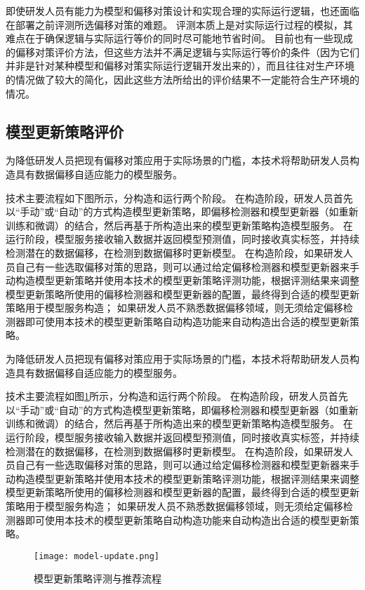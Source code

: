 即使研发人员有能力为模型和偏移对策设计和实现合理的实际运行逻辑，也还面临在部署之前评测所选偏移对策的难题。
评测本质上是对实际运行过程的模拟，其难点在于确保逻辑与实际运行等价的同时尽可能地节省时间。
目前也有一些现成的偏移对策评价方法，但这些方法并不满足逻辑与实际运行等价的条件（因为它们并非是针对某种模型和偏移对策实际运行逻辑开发出来的），而且往往对生产环境的情况做了较大的简化，因此这些方法所给出的评价结果不一定能符合生产环境的情况。

\subsection{模型更新策略评价}

为降低研发人员把现有偏移对策应用于实际场景的门槛，本技术将帮助研发人员构造具有数据偏移自适应能力的模型服务。

技术主要流程如下图所示，分构造和运行两个阶段。
在构造阶段，研发人员首先以“手动”或“自动”的方式构造模型更新策略，即偏移检测器和模型更新器（如重新训练和微调）的结合，然后再基于所构造出来的模型更新策略构造模型服务。
在运行阶段，模型服务接收输入数据并返回模型预测值，同时接收真实标签，并持续检测潜在的数据偏移，在检测到数据偏移时更新模型。
在构造阶段，如果研发人员自己有一些选取偏移对策的思路，则可以通过给定偏移检测器和模型更新器来手动构造模型更新策略并使用本技术的模型更新策略评测功能，根据评测结果来调整模型更新策略所使用的偏移检测器和模型更新器的配置，最终得到合适的模型更新策略用于模型服务构造；
如果研发人员不熟悉数据偏移领域，则无须给定偏移检测器即可使用本技术的模型更新策略自动构造功能来自动构造出合适的模型更新策略。

为降低研发人员把现有偏移对策应用于实际场景的门槛，本技术将帮助研发人员构造具有数据偏移自适应能力的模型服务。

技术主要流程如图\ref{fig:modelupdate}所示，分构造和运行两个阶段。
在构造阶段，研发人员首先以“手动”或“自动”的方式构造模型更新策略，即偏移检测器和模型更新器（如重新训练和微调）的结合，然后再基于所构造出来的模型更新策略构造模型服务。
在运行阶段，模型服务接收输入数据并返回模型预测值，同时接收真实标签，并持续检测潜在的数据偏移，在检测到数据偏移时更新模型。
在构造阶段，如果研发人员自己有一些选取偏移对策的思路，则可以通过给定偏移检测器和模型更新器来手动构造模型更新策略并使用本技术的模型更新策略评测功能，根据评测结果来调整模型更新策略所使用的偏移检测器和模型更新器的配置，最终得到合适的模型更新策略用于模型服务构造；
如果研发人员不熟悉数据偏移领域，则无须给定偏移检测器即可使用本技术的模型更新策略自动构造功能来自动构造出合适的模型更新策略。

\begin{figure}
  \centering
  \texttt{[image: model-update.png]}
  \caption{模型更新策略评测与推荐流程}
  \label{fig:modelupdate}
\end{figure}

